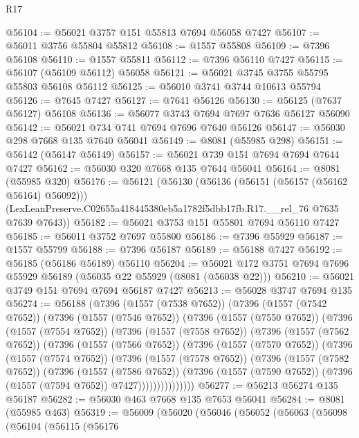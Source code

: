 \begin{lexlean}{R17}
\begin{coremodule}
@56104 := @56021 @3757 @151 @55813 @7694 @56058 @7427
@56107 := @56011 @3756 @55804 @55812
@56108 := @1557 @55808
@56109 := @7396 @56108
@56110 := @1557 @55811
@56112 := @7396 @56110 @7427
@56115 := @56107 (@56109 @56112) @56058
@56121 := @56021 @3745 @3755 @55795 @55803 @56108 @56112
@56125 := @56010 @3741 @3744 @10613 @55794
@56126 := @7645 @7427
@56127 := @7641 @56126
@56130 := @56125 (@7637 @56127) @56108
@56136 := @56077 @3743 @7694 @7697 @7636 @56127 @56090
@56142 := @56021 @734 @741 @7694 @7696 @7640 @56126
@56147 := @56030 @298 @7668 @135 @7640 @56041
@56149 := @8081 (@55985 @298)
@56151 := @56142 (@56147 @56149)
@56157 := @56021 @739 @151 @7694 @7694 @7644 @7427
@56162 := @56030 @320 @7668 @135 @7644 @56041
@56164 := @8081 (@55985 @320)
@56176 := @56121
    (@56130
      (@56136 (@56151 (@56157 (@56162 @56164) @56092)))
      (LexLeanPreserve.C02655a418445380eb5a1782f5dbb17fb.R17.__rel_76 @7635 @7639 @7643))
@56182 := @56021 @3753 @151 @55801 @7694 @56110 @7427
@56185 := @56011 @3752 @7697 @55800
@56186 := @7396 @55929
@56187 := @1557 @55799
@56188 := @7396 @56187
@56189 := @56188 @7427
@56192 := @56185 (@56186 @56189) @56110
@56204 := @56021 @172 @3751 @7694 @7696 @55929 @56189 (@56035 @22 @55929 (@8081 (@56038 @22)))
@56210 := @56021 @3749 @151 @7694 @7694 @56187 @7427
@56213 := @56028 @3747 @7694 @135
@56274 := @56188
    (@7396
      (@1557 (@7538 @7652))
      (@7396
        (@1557 (@7542 @7652))
        (@7396
          (@1557 (@7546 @7652))
          (@7396
            (@1557 (@7550 @7652))
            (@7396
              (@1557 (@7554 @7652))
              (@7396
                (@1557 (@7558 @7652))
                (@7396
                  (@1557 (@7562 @7652))
                  (@7396
                    (@1557 (@7566 @7652))
                    (@7396
                      (@1557 (@7570 @7652))
                      (@7396
                        (@1557 (@7574 @7652))
                        (@7396
                          (@1557 (@7578 @7652))
                          (@7396
                            (@1557 (@7582 @7652))
                            (@7396
                              (@1557 (@7586 @7652))
                              (@7396
                                (@1557 (@7590 @7652))
                                (@7396 (@1557 (@7594 @7652)) @7427)))))))))))))))
@56277 := @56213 @56274 @135 @56187
@56282 := @56030 @463 @7668 @135 @7653 @56041
@56284 := @8081 (@55985 @463)
@56319 := @56009
    (@56020
      (@56046
        (@56052
          (@56063
            (@56098
              (@56104
                (@56115
                  (@56176

\end{coremodule}
\end{lexlean}
